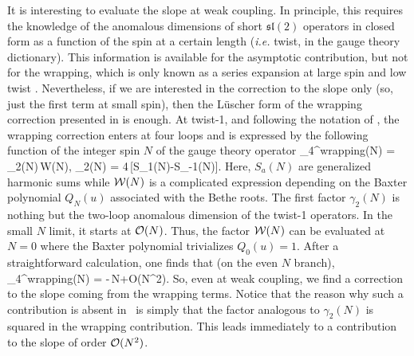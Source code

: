 It is interesting to evaluate the slope at weak coupling.
 In principle, this  requires the knowledge of the anomalous dimensions of 
short $\mathfrak{sl}(2)$ operators in closed form as a function of the spin at a certain length ({\em i.e.} twist, in the gauge theory
dictionary). This information is 
available for the asymptotic contribution, but not for the wrapping, which is only known as a series expansion 
at large spin and low twist \cite{Beccaria:2009ny,Beccaria:2010kd}.
 Nevertheless, if we are interested in the correction to the slope only (so, just the first term at small spin), then the L\"uscher form of the wrapping correction
presented in \cite{Beccaria:2009ny} is enough. 
At twist-1, and following the notation of \cite{Beccaria:2009ny}, the wrapping correction enters at four loops
and is expressed by the following function of the integer spin $N$ of the gauge theory operator
\beq
\gamma_{4}^{\rm wrapping}(N) = \gamma_{2}(N)\,\mc W(N),
\qquad \gamma_{2}(N) = 4\,[S_{1}(N)-S_{-1}(N)].
\eeq
Here, $S_{a}(N)$ are generalized harmonic sums while $\mathcal W(N)$ is a complicated expression depending on the 
Baxter polynomial $Q_{N}(u)$ associated with the Bethe roots. The first factor $\gamma_{2}(N)$ 
is nothing but the two-loop
anomalous dimension of the twist-1 operators. In the small $N$ limit, it starts at $\mathcal O(N)$. Thus, the 
factor $\mathcal W(N)$ can be evaluated at $N=0$ where the Baxter polynomial trivializes $Q_{0}(u)=1$.
After a straightforward calculation, one finds that (on the even $N$ branch),
\beq
\gamma_{4}^{\rm wrapping}(N) = -\,N+\mc O(N^{2}).
\eeq
So, even at weak coupling, we find a correction to the slope coming from the wrapping 
terms.
Notice that  the reason why such a contribution is absent in \ads\ is simply that the factor analogous to $\gamma_{2}(N)$ is squared in the wrapping contribution. 
This leads immediately to a contribution to the slope of order $\mathcal O(N^{2})$.



